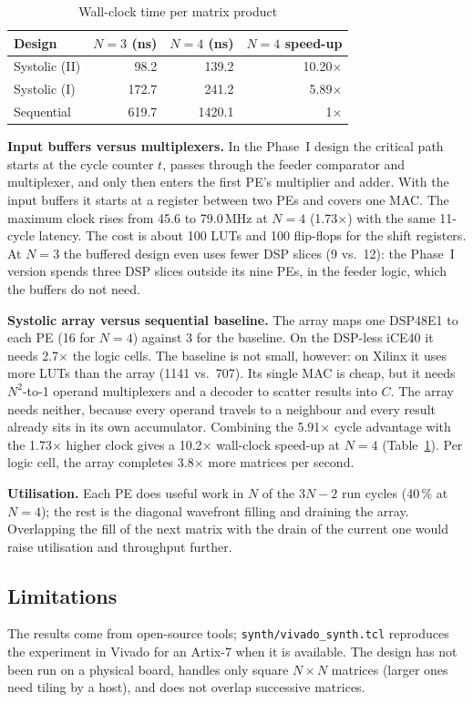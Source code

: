 \documentclass[conference]{IEEEtran}
\begin{document}
\begin{table}[t]
\caption{Wall-clock time per matrix product}
\label{tab:wall}
\centering
\begin{tabular}{@{}lrrr@{}}
\toprule
Design & $N=3$ (ns) & $N=4$ (ns) & $N=4$ speed-up \\
\midrule
Systolic (II) & 98.2 & 139.2 & 10.20$\times$ \\
Systolic (I) & 172.7 & 241.2 & 5.89$\times$ \\
Sequential & 619.7 & 1420.1 & 1$\times$ \\
\bottomrule
\end{tabular}
\end{table}

\textbf{Input buffers versus multiplexers.} In the Phase~I design the critical
path starts at the cycle counter $t$, passes through the feeder comparator and
multiplexer, and only then enters the first PE's multiplier and adder. With the
input buffers it starts at a register between two PEs and covers one MAC. The
maximum clock rises from 45.6 to 79.0\,MHz at $N = 4$ (1.73$\times$) with the
same 11-cycle latency. The cost is about 100 LUTs and 100 flip-flops for the
shift registers. At $N = 3$ the buffered design even uses fewer DSP slices (9
vs.\ 12): the Phase~I version spends three DSP slices outside its nine PEs,
in the feeder logic, which the buffers do not need.

\textbf{Systolic array versus sequential baseline.} The array maps one
DSP48E1 to each PE (16 for $N = 4$) against 3 for the baseline. On the
DSP-less iCE40 it needs 2.7$\times$ the logic cells. The baseline is not small,
however: on Xilinx it uses more LUTs than the array (1141 vs.\ 707). Its single MAC is
cheap, but it needs $N^2$-to-1 operand multiplexers and a decoder to scatter
results into $C$. The array needs neither, because every operand travels to a
neighbour and every result already sits in its own accumulator. Combining the
5.91$\times$ cycle advantage with the 1.73$\times$ higher clock gives a
10.2$\times$ wall-clock speed-up at $N = 4$ (Table~\ref{tab:wall}). Per logic
cell, the array completes 3.8$\times$ more matrices per second.

\textbf{Utilisation.} Each PE does useful work in $N$ of the $3N-2$ run cycles
(40\,\% at $N = 4$); the rest is the diagonal wavefront filling and draining the
array. Overlapping the fill of the next matrix with the drain of the current one
would raise utilisation and throughput further.

\subsection{Limitations}
The results come from open-source tools; \texttt{synth/vivado\_synth.tcl}
reproduces the experiment in Vivado for an Artix-7 when it is available. The
design has not been run on a physical board, handles only square $N \times N$
matrices (larger ones need tiling by a host), and does not overlap successive
matrices.
\end{document}
